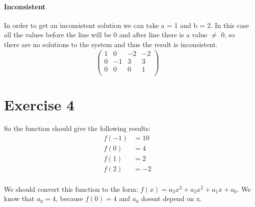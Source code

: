 \documentclass[a4paper]{article}
\begin{document}
\paragraph{Inconsistent} In order to get an inconsistent solution we can take a = 1 and b = 2. In this case all the values before the line will be 0 and after line there is a value $\neq$ 0, so there are no solutions to the system and thus the result is inconsistent.
\[
\left(
\begin{array}{ccc|c}
1 & 0 & - 2 & -2   \\
0 & -1 & 3& 3  \\
0 & 0 & 0 & 1 \\
\end{array}
\right)
\]

\section*{Exercise 4}
So the function should give the following results:
\begin{align*}
  f(-1) &= 10 \\
  f(0) &= 4 \\
  f(1) &= 2 \\
  f(2) &= -2\\
\end{align*}

We should convert this function to the form: $f(x) = a_3x^3 + a_2x^2 + a_1x + a_0$. We know that $a_0 = 4$, because $f(0) = 4$ and $a_0$ doesnt depend on x.
\end{document}
